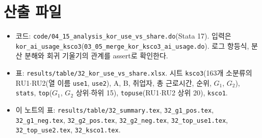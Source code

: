 \documentclass[11pt]{article}
\begin{document}
\section{산출 파일}

\begin{itemize}[leftmargin=*]
  \item 코드: \texttt{code/04\_15\_analysis\_kor\_use\_vs\_share.do}(Stata 17). 입력은 \texttt{kor\_ai\_usage\_ksco3}(\texttt{03\_05\_merge\_kor\_ksco3\_ai\_usage.do}). 로그 항등식, 분산 분해와 회귀 기울기의 관계를 assert로 확인한다.
  \item 표: \texttt{results/table/32\_kor\_use\_vs\_share.xlsx}. 시트 \texttt{ksco3}(163개 소분류의 RU1$\cdot$RU2(열 이름 \texttt{use1}, \texttt{use2}), A, B, 취업자, 총 근로시간, 순위, $G_1$, $G_2$), \texttt{stats}, \texttt{top}($G_1$, $G_2$ 상위$\cdot$하위 15), \texttt{topuse}(RU1$\cdot$RU2 상위 20), \texttt{ksco1}.
  \item 이 노트의 표: \texttt{results/table/32\_summary.tex}, \texttt{32\_g1\_pos.tex}, \texttt{32\_g1\_neg.tex}, \texttt{32\_g2\_pos.tex}, \texttt{32\_g2\_neg.tex}, \texttt{32\_top\_use1.tex}, \texttt{32\_top\_use2.tex}, \texttt{32\_ksco1.tex}.
\end{itemize}
\end{document}
